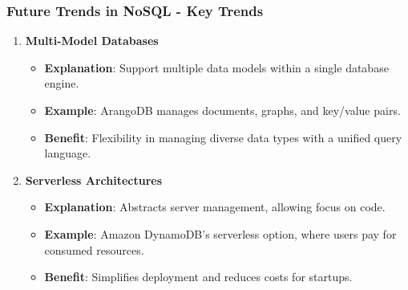 \documentclass[aspectratio=169]{beamer}
\begin{document}
\begin{frame}[fragile]
    \frametitle{Future Trends in NoSQL - Key Trends}
    \begin{enumerate}
        \item \textbf{Multi-Model Databases}  
            \begin{itemize}
                \item \textbf{Explanation}: Support multiple data models within a single database engine.
                \item \textbf{Example}: ArangoDB manages documents, graphs, and key/value pairs.
                \item \textbf{Benefit}: Flexibility in managing diverse data types with a unified query language.
            \end{itemize}
    
        \item \textbf{Serverless Architectures}  
            \begin{itemize}
                \item \textbf{Explanation}: Abstracts server management, allowing focus on code.
                \item \textbf{Example}: Amazon DynamoDB's serverless option, where users pay for consumed resources.
                \item \textbf{Benefit}: Simplifies deployment and reduces costs for startups.
            \end{itemize}
    \end{enumerate}
\end{frame}
\end{document}
